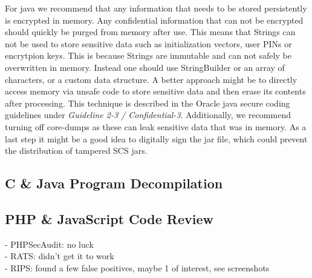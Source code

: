 \documentclass{llncs}
\begin{document}
For java we recommend that any information that needs to be stored persistently is encrypted in memory. Any confidential information that can not be encrypted should quickly be purged from memory after use. This means that Strings can not be used to store sensitive data such as initialization vectors, user PINs or encrytpion keys. This is because Strings are immutable and can not safely be overwritten in memory. Instead one should use StringBuilder or an array of characters, or a custom data structure. A better approach might be to directly access memory via unsafe code to store sensitive data and then erase its contents after processing. This technique is described in the Oracle java secure coding guidelines under \emph{Guideline 2-3 / Confidential-3}. Additionally, we recommend turning off core-dumps as these can leak sensitive data that was in memory. As a last step it might be a good idea to digitally sign the jar file, which could prevent the distribution of tampered SCS jars.

\subsection{C \& Java Program Decompilation}

\subsection{PHP \& JavaScript Code Review}
- PHPSecAudit: no luck\\
- RATS: didn't get it to work\\
- RIPS: found a few false positives, maybe 1 of interest, see screenshots\\
%
\end{document}
